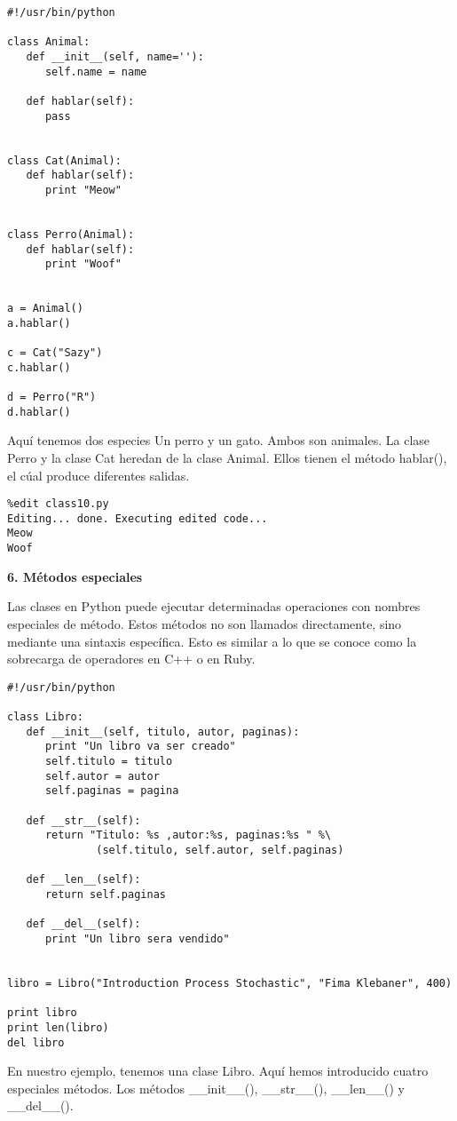 \documentclass[twoside,10.5pt]{article}%
\begin{document}
\begin{verbatim}
#!/usr/bin/python

class Animal:
   def __init__(self, name=''):
      self.name = name

   def hablar(self):
      pass


class Cat(Animal):
   def hablar(self):
      print "Meow"


class Perro(Animal):
   def hablar(self):
      print "Woof"


a = Animal()
a.hablar()

c = Cat("Sazy")
c.hablar()

d = Perro("R")
d.hablar()
\end{verbatim}


Aqu\'i tenemos dos especies Un perro y un gato. Ambos son animales. La clase Perro y la clase Cat  heredan de la clase Animal. Ellos tienen el m\'etodo hablar(), el c\'ual produce diferentes salidas.

\begin{verbatim}
%edit class10.py
Editing... done. Executing edited code...
Meow
Woof
\end{verbatim}


\textbf{6. M\'etodos especiales}

Las clases en  Python puede ejecutar determinadas operaciones con nombres especiales de m\'etodo. Estos m\'etodos no son llamados directamente, sino mediante una sintaxis espec\'ifica. Esto es similar a lo que se conoce como la sobrecarga de operadores en C++ o en Ruby.


\begin{verbatim}
#!/usr/bin/python

class Libro:
   def __init__(self, titulo, autor, paginas):
      print "Un libro va ser creado"
      self.titulo = titulo
      self.autor = autor
      self.paginas = pagina

   def __str__(self):
      return "Titulo: %s ,autor:%s, paginas:%s " %\
              (self.titulo, self.autor, self.paginas)

   def __len__(self):
      return self.paginas

   def __del__(self):
      print "Un libro sera vendido"


libro = Libro("Introduction Process Stochastic", "Fima Klebaner", 400)

print libro
print len(libro)
del libro
\end{verbatim}


En nuestro ejemplo, tenemos una clase Libro. Aqu\'i hemos introducido cuatro especiales m\'etodos. Los
m\'etodos {\color{blue}\_\_init\_\_()}, {\color{blue}\_\_str\_\_()}, {\color{blue}\_\_len\_\_()} y {\color{blue}\_\_del\_\_()}.
\end{document}
